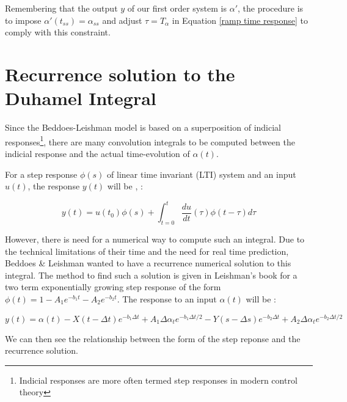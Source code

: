 \noindent Remembering that the output $y$ of our first order system is $\alpha'$, the procedure is to impose $\alpha'(t_{ss}) = \alpha_{ss}$ and adjust $\tau = T_\alpha$ in Equation \eqref{ramp time response} to comply with this constraint.

\section{Recurrence solution to the Duhamel Integral}
\label{section:duhamel}
Since the Beddoes-Leishman model is based on a superposition of indicial responses\footnote{Indicial responses are more often termed step responses in modern control theory}, there are many convolution integrals to be computed between the indicial response and the actual time-evolution of $\alpha(t)$.

For a step response $\phi(s)$ of linear time invariant (LTI) system and an input $u(t)$, the response $y(t)$ will be \cite{hendricks_linear_2008}, \cite{bonvin_systemes_2015}: 

\begin{equation}
     y(t) = u(t_0)\phi(s) + \int_{t=0}^{t}\frac{du}{dt}(\tau)\phi(t-\tau) d\tau
\end{equation}

However, there is need for a numerical way to compute such an integral. Due to the technical limitations of their time and the need for real time prediction, Beddoes \& Leishman wanted to have a recurrence numerical solution to this integral. The method to find such a solution is given in Leishman's book \cite[p.459-462]{leishman_principles_2006} for a two term exponentially growing step response of the form $\phi(t)=1-A_{1} e^{-b_{1} t}-A_{2} e^{-b_{2} t}$. The response to an input $\alpha(t)$ will be : 

\begin{equation}
     y(t) = \alpha(t)-X(t-\Delta t) e^{-b_{1} \Delta t}+A_{1} \Delta \alpha_{t} e^{-b_{1} \Delta t / 2} - Y(s-\Delta s) e^{-b_{2} \Delta t}+A_{2} \Delta \alpha_{t} e^{-b_{2} \Delta t / 2}
\end{equation}

We can then see the relationship between the form of the step reponse and the recurrence solution.